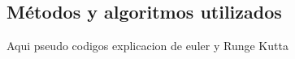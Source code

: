 \documentclass{wscpaperproc}
\theoremstyle{wsc}
\newtheorem{theorem}{Teorema}
\newtheorem{corollary}[theorem]{Corolario}
\newtheorem{definition}{Definici\'on}
\begin{document}
\subsection{M\'etodos y algoritmos utilizados}
Aqui pseudo codigos explicacion de euler y Runge Kutta








\end{document}
